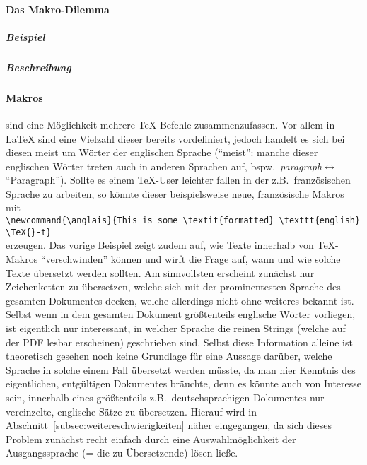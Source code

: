 \paragraph*{Das Makro-Dilemma}%
\subparagraph*{Beispiel}
\subparagraph*{Beschreibung}

\paragraph*{Makros} sind eine Möglichkeit mehrere \TeX{}-Befehle zusammenzufassen. Vor allem in \LaTeX{} sind eine Vielzahl dieser bereits vordefiniert, jedoch handelt es sich bei diesen meist um Wörter der englischen Sprache (\enquote{meist}: manche dieser englischen Wörter treten auch in anderen Sprachen auf, bspw.\ \textit{paragraph}$\leftrightarrow$\enquote{Paragraph}). Sollte es einem \TeX{}-User leichter fallen in der z.B.\ französischen Sprache zu arbeiten, so könnte dieser beispielsweise neue, französische Makros mit \\\verb|\newcommand{\anglais}{This is some \textit{formatted} \texttt{english} \TeX{}-t}|\\erzeugen. Das vorige Beispiel zeigt zudem auf, wie Texte innerhalb von \TeX{}-Makros \enquote{verschwinden} können und wirft die Frage auf, wann und wie solche Texte übersetzt werden sollten. Am sinnvollsten erscheint zunächst nur Zeichenketten zu übersetzen, welche sich mit der prominentesten Sprache des gesamten Dokumentes decken, welche allerdings nicht ohne weiteres bekannt ist. Selbst wenn in dem gesamten Dokument größtenteils englische Wörter vorliegen, ist eigentlich nur interessant, in welcher Sprache die reinen Strings (welche auf der PDF lesbar erscheinen) geschrieben sind. Selbst diese Information alleine ist theoretisch gesehen noch keine Grundlage für eine Aussage darüber, welche Sprache in solche einem Fall übersetzt werden müsste, da man hier Kenntnis des eigentlichen, entgültigen Dokumentes bräuchte, denn es könnte auch von Interesse sein, innerhalb eines größtenteils z.B.\ deutschsprachigen Dokumentes nur vereinzelte, englische Sätze zu übersetzen. Hierauf wird in Abschnitt~\ref{subsec:weitereschwierigkeiten} näher eingegangen, da sich dieses Problem zunächst recht einfach durch eine Auswahlmöglichkeit der Ausgangssprache (= die zu Übersetzende) lösen ließe.\\%
